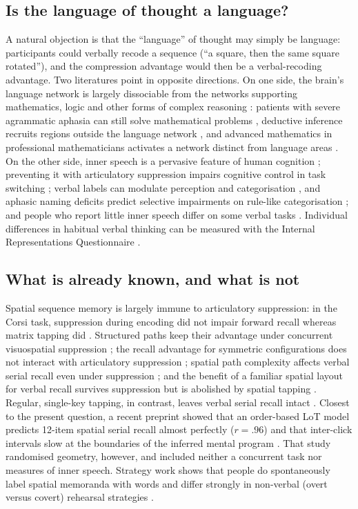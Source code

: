\documentclass[11pt,a4paper]{article}
\begin{document}
\subsection{Is the language of thought a language?}
A natural objection is that the ``language'' of thought may simply be language: participants could verbally recode a sequence
(``a square, then the same square rotated''), and the compression advantage would then be a verbal-recoding advantage. Two
literatures point in opposite directions. On one side, the brain's language network is largely dissociable from the networks
supporting mathematics, logic and other forms of complex reasoning \citep{fedorenko2016language,fedorenko2024language}: patients
with severe agrammatic aphasia can still solve mathematical problems \citep{varley2005agrammatic}, deductive inference recruits
regions outside the language network \citep{monti2009boundaries}, and advanced mathematics in professional mathematicians
activates a network distinct from language areas \citep{amalric2016origins}. On the other side, inner speech is a pervasive
feature of human cognition \citep{aldersonday2015inner}; preventing it with articulatory suppression impairs cognitive control
in task switching \citep{emerson2003role}; verbal labels can modulate perception and categorisation
\citep{lupyan2012linguistically}, and aphasic naming deficits predict selective impairments on rule-like categorisation
\citep{lupyan2013linking}; and people who report little inner speech differ on some verbal tasks
\citep{nedergaard2024not}. Individual differences in habitual verbal thinking can be measured with the Internal Representations
Questionnaire \citep{roebuck2020internal}.

\subsection{What is already known, and what is not}
Spatial sequence memory is largely immune to articulatory suppression: in the Corsi task, suppression during encoding did not
impair forward recall whereas matrix tapping did \citep{vandierendonck2004working}. Structured paths keep their advantage under
concurrent visuospatial suppression \citep{kemps2001complexity}; the recall advantage for symmetric configurations does not
interact with articulatory suppression \citep{rossiarnaud2006symmetry}; spatial path complexity affects verbal serial recall
even under suppression \citep{allan2017right}; and the benefit of a familiar spatial layout for verbal recall survives
suppression but is abolished by spatial tapping \citep{allen2024maintaining}. Regular, single-key tapping, in contrast, leaves
verbal serial recall intact \citep{larsen2003disruption}. Closest to the present question, a recent preprint showed that an
order-based LoT model predicts 12-item spatial serial recall almost perfectly ($r = .96$) and that inter-click intervals slow
at the boundaries of the inferred mental program \citep{tabbane2026humans}. That study randomised geometry, however, and
included neither a concurrent task nor measures of inner speech. Strategy work shows that people do spontaneously label
spatial memoranda with words \citep{seabra2025verbal} and differ strongly in non-verbal (overt versus covert) rehearsal
strategies \citep{desardenberg2024inter}.
\end{document}
